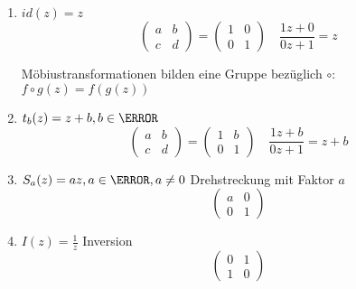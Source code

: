 \begin{bsp*}
	\begin{enumerate}[label = \arabic*)]
		\item $id(z) = z$
			\[ \begin{pmatrix} a & b \\ c & d \end{pmatrix} = \begin{pmatrix} 1 & 0 \\ 0 & 1 \end{pmatrix} \quad \frac{1z + 0}{0z + 1} = z \]
			\begin{bem}
				Möbiustransformationen bilden eine Gruppe bezüglich $\circ$: $f \circ g(z) = f(g(z))$
			\end{bem}
		\item $t_b(z) = z + b , b \in \C$
			\[ \begin{pmatrix} a & b \\ c & d \end{pmatrix} = \begin{pmatrix} 1 & b \\ 0 & 1 \end{pmatrix} \quad \frac{1z + b}{0z + 1} = z + b \]
		\item $S_a(z) = az , a \in \C , a \neq 0$ Drehstreckung mit Faktor $a$ \\
			\[ \begin{pmatrix} a & 0 \\ 0 & 1 \end{pmatrix} \]
		\item $I(z) = \frac{1}{z}$ Inversion
			\[ \begin{pmatrix} 0 & 1 \\ 1 & 0 \end{pmatrix} \]
	\end{enumerate}
\end{bsp*}

